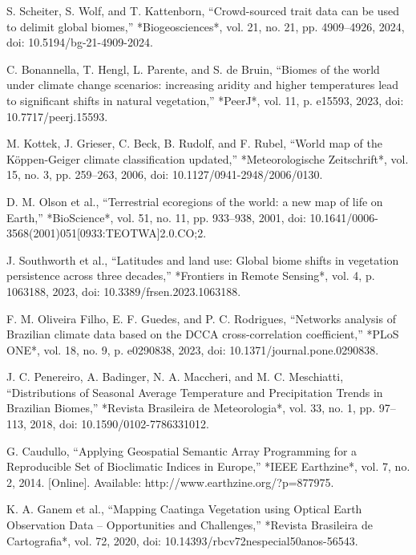 \documentclass[conference]{IEEEtran}
\begin{document}
\begin{thebibliography}{00}

  S. Scheiter, S. Wolf, and T. Kattenborn, “Crowd-sourced trait data can be used to delimit global biomes,” *Biogeosciences*, vol. 21, no. 21, pp. 4909--4926, 2024, doi: 10.5194/bg-21-4909-2024.
  
  C. Bonannella, T. Hengl, L. Parente, and S. de Bruin, “Biomes of the world under climate change scenarios: increasing aridity and higher temperatures lead to significant shifts in natural vegetation,” *PeerJ*, vol. 11, p. e15593, 2023, doi: 10.7717/peerj.15593.
  
  M. Kottek, J. Grieser, C. Beck, B. Rudolf, and F. Rubel, “World map of the Köppen-Geiger climate classification updated,” *Meteorologische Zeitschrift*, vol. 15, no. 3, pp. 259--263, 2006, doi: 10.1127/0941-2948/2006/0130.
  
  D. M. Olson et al., “Terrestrial ecoregions of the world: a new map of life on Earth,” *BioScience*, vol. 51, no. 11, pp. 933--938, 2001, doi: 10.1641/0006-3568(2001)051[0933:TEOTWA]2.0.CO;2.
  
  J. Southworth et al., “Latitudes and land use: Global biome shifts in vegetation persistence across three decades,” *Frontiers in Remote Sensing*, vol. 4, p. 1063188, 2023, doi: 10.3389/frsen.2023.1063188.
  
  F. M. Oliveira Filho, E. F. Guedes, and P. C. Rodrigues, “Networks analysis of Brazilian climate data based on the DCCA cross-correlation coefficient,” *PLoS ONE*, vol. 18, no. 9, p. e0290838, 2023, doi: 10.1371/journal.pone.0290838.
  
  J. C. Penereiro, A. Badinger, N. A. Maccheri, and M. C. Meschiatti, “Distributions of Seasonal Average Temperature and Precipitation Trends in Brazilian Biomes,” *Revista Brasileira de Meteorologia*, vol. 33, no. 1, pp. 97--113, 2018, doi: 10.1590/0102-7786331012.
  
  G. Caudullo, “Applying Geospatial Semantic Array Programming for a Reproducible Set of Bioclimatic Indices in Europe,” *IEEE Earthzine*, vol. 7, no. 2, 2014. [Online]. Available: http://www.earthzine.org/?p=877975.
  
  K. A. Ganem et al., “Mapping Caatinga Vegetation using Optical Earth Observation Data – Opportunities and Challenges,” *Revista Brasileira de Cartografia*, vol. 72, 2020, doi: 10.14393/rbcv72nespecial50anos-56543.
  

\end{thebibliography}
\end{document}
